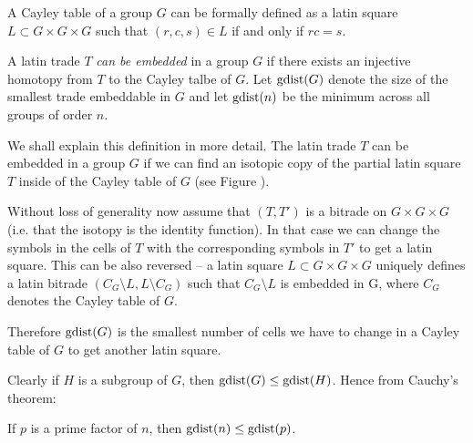 A Cayley table of a group $G$ can be formally defined as a latin square $L \subset G \times G \times G$ such that $(r,c,s) \in L$ if and only if $rc = s$.%

\begin{defn}
A latin trade $T$ \emph{can be embedded} in a group $G$ if there exists an injective homotopy from $T$ to the Cayley talbe of $G$. Let \emph{$\mathop{\mathrm{gdist}}(G)$} denote the size of the smallest trade embeddable in $G$ and let \emph{$\mathop{\mathrm{gdist}}(n)$} be the minimum across all groups of order $n$.
\end{defn}

We shall explain this definition in more detail. The latin trade $T$ can be embedded in a group $G$ if we can find an isotopic copy of the partial latin square $T$ inside of the Cayley table of $G$ (see Figure ).

Without loss of generality now assume that $(T,T')$ is a bitrade on $G \times G \times G$  (i.e. that the isotopy is the identity function). In that case we can change the symbols in the cells of $T$ with the corresponding symbols in $T'$ to get a latin square. This can be also reversed -- a latin square $L \subset G \times G \times G$ uniquely defines a latin bitrade $(C_G\setminus L, L\setminus C_G)$ such that $C_G\setminus L$ is embedded in G, where $C_G$ denotes the Cayley table of $G$.

Therefore $\mathop{\mathrm{gdist}}(G)$ is the smallest number of cells we have to change in a Cayley table of $G$ to get another latin square.

\bigskip

Clearly if $H$ is a subgroup of $G$, then $\mathop{\mathrm{gdist}}(G) \leq \mathop{\mathrm{gdist}}(H)$. Hence from Cauchy's theorem:

\begin{lem}
\label{lem:gdist-n-leq-gdist-p}
If $p$ is a prime factor of $n$, then $\mathop{\mathrm{gdist}}(n) \leq \mathop{\mathrm{gdist}}(p)$.
\end{lem}%
